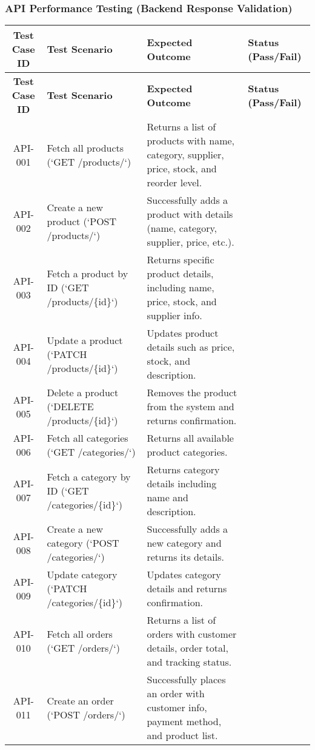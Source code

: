 \documentclass{llncs}
\begin{document}
\subsubsection{API Performance Testing (Backend Response Validation)}

\renewcommand{\arraystretch}{1.3} %

\begin{longtable}{|c|>{\raggedright}p{7.5cm}|p{5.5cm}|p{2cm}|}
\hline
\textbf{Test Case ID} & \textbf{Test Scenario} & \textbf{Expected Outcome} & \textbf{Status (Pass/Fail)} \\ \hline
\endfirsthead
\hline
\textbf{Test Case ID} & \textbf{Test Scenario} & \textbf{Expected Outcome} & \textbf{Status (Pass/Fail)} \\ \hline
\endhead
API-001 & Fetch all products (`GET /products/`) & Returns a list of products with name, category, supplier, price, stock, and reorder level. & \\ \hline
API-002 & Create a new product (`POST /products/`) & Successfully adds a product with details (name, category, supplier, price, etc.). & \\ \hline
API-003 & Fetch a product by ID (`GET /products/\{id\}`) & Returns specific product details, including name, price, stock, and supplier info. & \\ \hline
API-004 & Update a product (`PATCH /products/\{id\}`) & Updates product details such as price, stock, and description. & \\ \hline
API-005 & Delete a product (`DELETE /products/\{id\}`) & Removes the product from the system and returns confirmation. & \\ \hline
API-006 & Fetch all categories (`GET /categories/`) & Returns all available product categories. & \\ \hline
API-007 & Fetch a category by ID (`GET /categories/\{id\}`) & Returns category details including name and description. & \\ \hline
API-008 & Create a new category (`POST /categories/`) & Successfully adds a new category and returns its details. & \\ \hline
API-009 & Update category (`PATCH /categories/\{id\}`) & Updates category details and returns confirmation. & \\ \hline
API-010 & Fetch all orders (`GET /orders/`) & Returns a list of orders with customer details, order total, and tracking status. & \\ \hline
API-011 & Create an order (`POST /orders/`) & Successfully places an order with customer info, payment method, and product list. & \\ \hline

\end{longtable}
\end{document}
